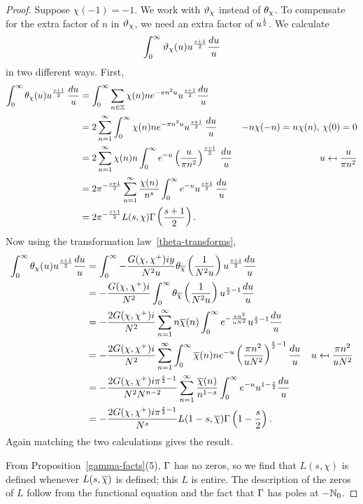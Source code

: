 \begin{proof}
 Suppose $\chi(-1)=-1$. We work with $\vartheta_{{\chi}}$ instead of $\theta_{\chi}$. To compensate for the extra factor of $n$ in $\vartheta_{\chi}$, we need an extra factor of $u^{\frac{1}{2}}$.  We calculate
\[
\int_0^{\infty} \vartheta_{\chi}(u) u^{\frac{s+1}2}\frac{du}{u}
\]
in two different ways. First,
\begin{align*}
\int_0^{\infty} \theta_{\chi}(u)u^{\frac{s+1}2} \,\frac{du}u
&=\int_0^{\infty} \sum_{n\in\mathbb{Z}} \chi(n) ne^{-\pi n^2u}u^{\frac {s+1}2}\frac{du}u\\
&=2\sum_{n=1}^{\infty} \int_0^{\infty} \chi(n) ne^{-\pi n^2u}u^{\frac{s+1}2}\,\frac{du}u&-n\chi(-n)=n\chi(n),\, \chi(0)=0\\
&=2\sum_{n=1}^{\infty} \chi(n)n\int_0^{\infty} e^{-u} \left( {\frac{u}{\pi n^2}} \right)^{\frac{s+1}2}\,\frac{du}u&u\mapsfrom \frac{u}{\pi n^2}\\
&=2\pi^{-\frac{s+1}2}\sum_{n=1}^{\infty} \frac{\chi(n)}{n^s}\int_0^{\infty} e^{-u} u^{\frac{s+1}2}\,\frac{du}u\\
&=2\pi^{-\frac{s+1}2} L(s,\chi)\Gamma\left( {\frac{s+1}{2}} \right).
\end{align*}
Now using the transformation law~\ref{theta-transforms},
\begin{align*}
\int_0^{\infty} \theta_{\chi}(u) u^{\frac{s+1}2}\frac{du}{u}
&=\int_0^{\infty} -\frac{G(\chi,\chi^+)iy}{N^2u} \theta_{\overline{\chi}} \left( {\frac{1}{N^2u}} \right) u^{\frac{s+1}2}\frac{du}u\\
&=-\frac{G(\chi,\chi^+)i}{N^2} \int_0^{\infty} \theta_{\overline{\chi}} \left( {\frac{1}{N^2u}} \right) u^{\frac s2-1}\frac{du}u\\
&=-\frac{2G(\chi,\chi^+)i}{N^2} \sum_{n=1}^{\infty}n\overline{\chi}(n)\int_0^{\infty}  e^{-\frac{\pi n^2}{uN^2}} u^{\frac s2-1}\frac{du}u\\
&=-\frac{2G(\chi,\chi^+)i}{N^2} \sum_{n=1}^{\infty}\int_0^{\infty} \overline{\chi}(n)n e^{-u} \left( {\frac{\pi n^2}{uN^2}} \right)^{\frac s2-1}\frac{du}u&u\mapsfrom \frac{\pi n^2}{uN^2}\\
&=-\frac{2G(\chi,\chi^+)i\pi^{\frac s2-1}}{N^2N^{n-2}} \sum_{n=1}^{\infty} \frac{\overline{\chi}(n)}{n^{1-s}}\int_0^{\infty}e^{-u} u^{1-\frac{s}{2}}\frac{du}{u}\\
&=-\frac{2G(\chi,\chi^+)i\pi^{\frac s2-1}}{N^s} L(1-s,\overline{\chi}) \Gamma\left( {1-\frac s2} \right). &\qedhere
\end{align*}
Again matching the two calculations gives the result.

From Proposition~\ref{gamma-facts}(5), $\Gamma$ has no zeros, so we find that $L(s,\chi)$ is defined whenever $L(s,\overline{\chi})$ is defined; this $L$ is entire. 
The description of the zeros of $L$ follow from the functional equation and the fact that $\Gamma$ has poles at $-\mathbb{N}_0$. %
\end{proof}
